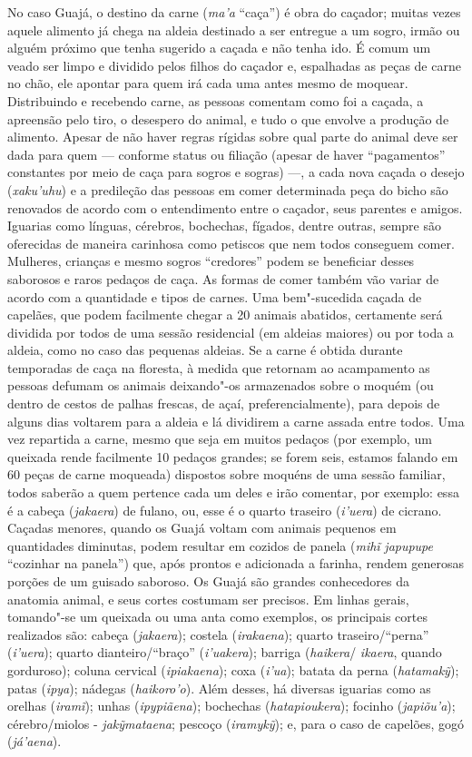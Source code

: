 No caso Guajá, o destino da carne (\emph{ma'a} ``caça'') é obra do
caçador; muitas vezes aquele alimento já chega na aldeia destinado a ser
entregue a um sogro, irmão ou alguém próximo que tenha sugerido a caçada
e não tenha ido. É comum um veado ser limpo e dividido pelos filhos do
caçador e, espalhadas as peças de carne no chão, ele apontar para quem
irá cada uma antes mesmo de moquear. Distribuindo e recebendo carne, as
pessoas comentam como foi a caçada, a apreensão pelo tiro, o desespero
do animal, e tudo o que envolve a produção de alimento. Apesar de não
haver regras rígidas sobre qual parte do animal deve ser dada para quem
--- conforme status ou filiação (apesar de haver ``pagamentos'' constantes
por meio de caça para sogros e sogras) ---, a cada nova caçada o desejo
(\emph{xaku'uhu}) e a predileção das pessoas em comer determinada peça
do bicho são renovados de acordo com o entendimento entre o caçador,
seus parentes e amigos. Iguarias como línguas, cérebros, bochechas,
fígados, dentre outras, sempre são oferecidas de maneira carinhosa como
petiscos que nem todos conseguem comer. Mulheres, crianças e mesmo
sogros ``credores'' podem se beneficiar desses saborosos e raros pedaços
de caça. As formas de comer também vão variar de acordo com a quantidade
e tipos de carnes. Uma bem"-sucedida caçada de capelães, que podem
facilmente chegar a 20 animais abatidos, certamente será dividida por
todos de uma sessão residencial (em aldeias maiores) ou por toda a
aldeia, como no caso das pequenas aldeias. Se a carne é obtida durante
temporadas de caça na floresta, à medida que retornam ao acampamento as
pessoas defumam os animais deixando"-os armazenados sobre o moquém (ou
dentro de cestos de palhas frescas, de açaí, preferencialmente), para
depois de alguns dias voltarem para a aldeia e lá dividirem a carne
assada entre todos. Uma vez repartida a carne, mesmo que seja em muitos
pedaços (por exemplo, um queixada rende facilmente 10 pedaços grandes;
se forem seis, estamos falando em 60 peças de carne moqueada) dispostos
sobre moquéns de uma sessão familiar, todos saberão a quem pertence cada
um deles e irão comentar, por exemplo: essa é a cabeça (\emph{jakaera})
de fulano, ou, esse é o quarto traseiro (\emph{i'uera}) de cicrano.
Caçadas menores, quando os Guajá voltam com animais pequenos em
quantidades diminutas, podem resultar em cozidos de panela (\emph{mihĩ}
\emph{japupupe} ``cozinhar na panela'') que, após prontos e adicionada a
farinha, rendem generosas porções de um guisado saboroso. Os Guajá são
grandes conhecedores da anatomia animal, e seus cortes costumam ser
precisos. Em linhas gerais, tomando"-se um queixada ou uma anta como
exemplos, os principais cortes realizados são: cabeça (\emph{jakaera});
costela (\emph{irakaena}); quarto traseiro/``perna'' (\emph{i'uera});
quarto dianteiro/``braço'' (\emph{i'uakera}); barriga (\emph{haikera}/
\emph{ikaera}, quando gorduroso); coluna cervical (\emph{ipiakaena});
coxa (\emph{i'ua}); batata da perna (\emph{hatamakỹ}); patas
(\emph{ipya}); nádegas (\emph{haikoro'o}). Além desses, há diversas
iguarias como as orelhas (\emph{iramĩ}); unhas (\emph{ipypiãena});
bochechas (\emph{hatapioukera}); focinho (\emph{japiõu'a});
cérebro/miolos - \emph{jakỹmataena}; pescoço (\emph{iramykỹ}); e, para
o caso de capelões, gogó (\emph{já'aena}).


